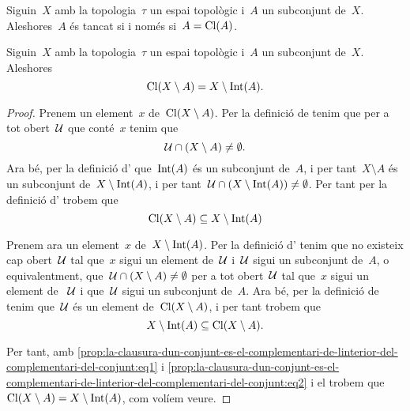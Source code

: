 \documentclass[../../main.tex]{subfiles}
\begin{document}
    \begin{corollary}
        \label{cor:un-conjunt-es-tancat-si-i-nomes-si-es-igual-a-la-seva-clausura}
        Siguin~\(X\) amb la topologia~\(\tau\) un espai topològic i~\(A\) un subconjunt de~\(X\).
        Aleshores~\(A\) és tancat si i només si~\(A=\operatorname{Cl}(A)\).
    \end{corollary}
    \begin{proposition}
        \label{prop:la-clausura-dun-conjunt-es-el-complementari-de-linterior-del-complementari-del-conjunt}
        Siguin~\(X\) amb la topologia~\(\tau\) un espai topològic i~\(A\) un subconjunt de~\(X\).
        Aleshores
        \[
            \operatorname{Cl}(X\setminus A)=X\setminus\operatorname{Int}(A).
        \]
    \end{proposition}
    \begin{proof} %
        Prenem un element~\(x\) de~\(\operatorname{Cl}(X\setminus A)\).
        Per la definició de  tenim que per a tot obert~\(\mathcal{U}\) que conté~\(x\) tenim que
        \[
            \mathcal{U}\cap(X\setminus A)\neq\emptyset.
        \]
        Ara bé, per la definició d' que~\(\operatorname{Int}(A)\) és un subconjunt de~\(A\), i per tant~\(X\setminus A\) és un subconjunt de~\(X\setminus\operatorname{Int}(A)\), i per tant~\(\mathcal{U}\cap(X\setminus\operatorname{Int}(A))\neq\emptyset\).
        Per tant per la definició d' trobem que
        \begin{equation}
            \label{prop:la-clausura-dun-conjunt-es-el-complementari-de-linterior-del-complementari-del-conjunt:eq1}
            \operatorname{Cl}(X\setminus A)\subseteq X\setminus\operatorname{Int}(A)
        \end{equation}

        Prenem ara un element~\(x\) de~\(X\setminus\operatorname{Int}(A)\).
        Per la definició d' tenim que no existeix cap obert~\(\mathcal{U}\) tal que~\(x\) sigui un element de~\(\mathcal{U}\) i~\(\mathcal{U}\) sigui un subconjunt de~\(A\), o equivalentment, que~\(\mathcal{U}\cap(X\setminus A)\neq\emptyset\) per a tot obert~\(\mathcal{U}\) tal que~\(x\) sigui un element de ~\(\mathcal{U}\) i que~\(\mathcal{U}\) sigui un subconjunt de~\(A\).
        Ara bé, per la definició de  tenim que~\(\mathcal{U}\) és un element de~\(\operatorname{Cl}(X\setminus A)\), i per tant trobem que
        \begin{equation}
            \label{prop:la-clausura-dun-conjunt-es-el-complementari-de-linterior-del-complementari-del-conjunt:eq2}
            X\setminus\operatorname{Int}(A)\subseteq\operatorname{Cl}(X\setminus A).
        \end{equation}

        Per tant, amb \eqref{prop:la-clausura-dun-conjunt-es-el-complementari-de-linterior-del-complementari-del-conjunt:eq1} i \eqref{prop:la-clausura-dun-conjunt-es-el-complementari-de-linterior-del-complementari-del-conjunt:eq2} i el  trobem que~\(\operatorname{Cl}(X\setminus A)=X\setminus\operatorname{Int}(A)\), com volíem veure.
    \end{proof}
\end{document}
